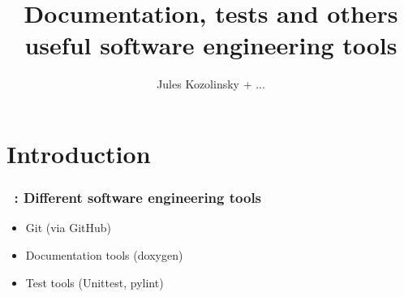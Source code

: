 \documentclass[a4paper, 11pt]{beamer}
\author{Jules Kozolinsky + ...}
\title{Documentation, tests and others useful software engineering tools }
\date{}
\institute{ENS Cachan}
\begin{document}
\begin{frame}
    \titlepage
\end{frame}

\section*{Introduction}

\begin{frame}
    \frametitle{\secname~: Different software engineering tools}
    \begin{itemize}
        \item Git (via GitHub)
        \item Documentation tools (doxygen)
        \item Test tools (Unittest, pylint)
    \end{itemize}
\end{frame}
\end{document}
